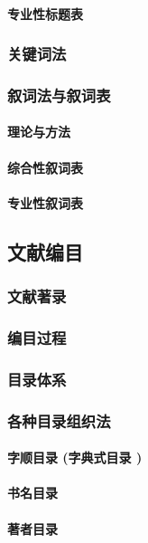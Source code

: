\documentclass[UTF8]{../../ApplicationUniverse}
\begin{document}
            \paragraph{专业性标题表}
        \subsubsection{关键词法}
        \subsubsection{叙词法与叙词表}
            \paragraph{理论与方法}
            \paragraph{综合性叙词表}
            \paragraph{专业性叙词表}
    \subsection{文献编目}
        \subsubsection{文献著录}
            \subsubsection{编目过程}
        \subsubsection{目录体系}
        \subsubsection{各种目录组织法}
            \paragraph{字顺目录 (字典式目录 )}
            \paragraph{书名目录}
            \paragraph{著者目录}
\end{document}
